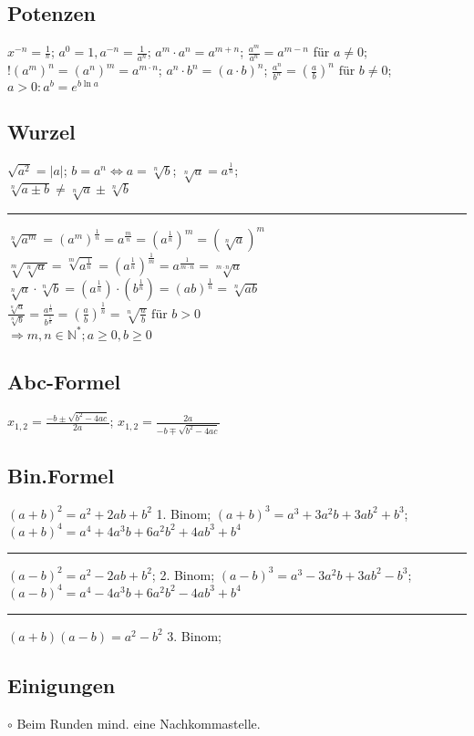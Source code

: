 \subsection{Potenzen}
$ x^{-n} = \frac{1}{^n} $; 
$ a^0 = 1, a^{-n} = \frac{1}{a^n} $; 
$ a^m \cdot a^n  = a^{m+n} $; 
$ \frac{a^m}{a^n} = a^{m-n} $ für $ a \ne 0 $; 
$ ! (a^m)^n = (a^n)^m = a^{m \cdot n} $; 
$ a^n \cdot b^n = (a \cdot b)^n $; 
$ \frac{a^n}{b^n} = (\frac{a}{b})^n \text{ für } b \ne  0 $; 
$ a >0 : a^b = e^{b \ln a} $

\subsection{Wurzel}
$ \sqrt{a ^2} = |a| $;
$ b = a^n  \Leftrightarrow a = \sqrt[n]{b}$; 
$ \sqrt[n]{a} = a^{\frac{1}{n}} $; \\
$ \sqrt[n]{a \pm b} \ne \sqrt[n]{a} \pm \sqrt[n]{b} $ \\
\hrule
$ \sqrt[n]{a^m} = (a^m)^{\frac{1}{n}} = a^{\frac{m}{n}} = (a^\frac{1}{n})^m = (\sqrt[n]{a})^m $ \\
$\sqrt[m]{\sqrt[n]{a}} = \sqrt[m]{a^{\frac{1}{n}}} = (a^{\frac{1}{n}})^{\frac{1}{m}} = a^{\frac{1}{m \cdot n}} = \sqrt[m \cdot n ]{a} $\\
$ \sqrt[n]{a} \cdot \sqrt[n]{b} = (a^{\frac{1}{n}}) \cdot (b^{\frac{1}{n}})  = (ab)^{\frac{1}{n}} = \sqrt[n]{ab} $\\
$ \frac{\sqrt[n]{a}}{\sqrt[n]{b}} = \frac{a^{\frac{1}{n}}}{b^{\frac{1}{n}}} = (\frac{a}{b})^{\frac{1}{n}} = \sqrt[n]{\frac{a}{b}} \text{ für } b > 0 $\\
$\Rightarrow m , n \in \mathbb{N}^*; a \ge  0, b \ge 0 $
\subsection{Abc-Formel}
$ x_{1,2} = \frac{-b \pm \sqrt{b^2 - 4ac}}{2a} $; 
$ x_{1,2} = \frac{2a}{-b \mp \sqrt{b^2 -4ac}} $
\subsection{Bin.Formel}
$ (a + b)^2 = a^2 + 2ab + b^2 $ 1. Binom;
$ (a+b)^3 = a^3 + 3a^2b + 3ab^2 + b^3 $; 
$ (a+b)^4 = a^4 + 4a^3b + 6a^2b^2 + 4ab^3 + b^4$
\hrule
$ (a-b)^2 = a^2 - 2ab + b^2 $; 2. Binom;
$ (a-b)^3 = a^3 - 3a^2b + 3ab^2 - b^3$; 
$ (a-b)^4 = a^4 - 4a^3b + 6a^2b^2 - 4ab^3 + b^4 $
\hrule
$ (a+b) (a-b) = a^2 - b^2 $ 3. Binom; 

\subsection{Einigungen}
	$\circ$ Beim Runden mind. eine Nachkommastelle.
